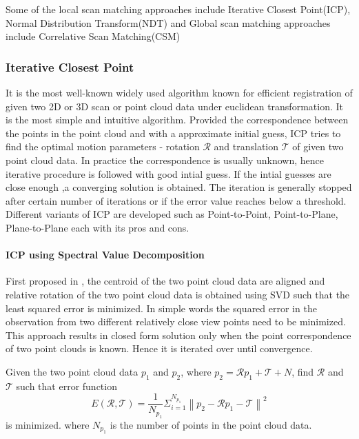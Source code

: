 Some of the local scan matching approaches include Iterative Closest Point(ICP), Normal  Distribution Transform(NDT) and Global scan matching approaches include Correlative Scan Matching(CSM)

\subsubsection{Iterative Closest Point}
    It is the most well-known widely used algorithm known for  efficient registration of given two 2D or 3D scan or point cloud data under euclidean transformation. It is the most simple and intuitive algorithm.
Provided the correspondence between the points in the point cloud and with a  approximate initial guess, ICP tries to find the optimal motion parameters - rotation $\mathcal{R}$ and translation $\mathcal{T}$ of given 
two point cloud data. In practice the correspondence is usually unknown, hence iterative procedure is followed with good intial guess. If the intial guesses are close enough ,a converging solution is obtained.
The iteration is generally stopped after certain number of iterations or if the error value reaches below a threshold. Different variants of ICP are developed such as Point-to-Point, Point-to-Plane,
Plane-to-Plane each with its pros and cons. 

\paragraph{ICP using Spectral Value Decomposition}
First proposed in \cite{KS.Arun}, the centroid of the two point cloud data are aligned and relative rotation of the two point cloud data is obtained using SVD such that the least squared error is minimized.
In simple words the squared error in the observation from two different relatively close view points need to be minimized. 
This approach results in closed form solution only when the point correspondence of two point clouds is known. Hence it is iterated over until convergence.
\par
Given the two point cloud data $p_1$ and $p_2$, where $p_2 = \mathcal{R}p_1 + \mathcal{T} + N$, find $\mathcal{R}$ and $\mathcal{T}$ such that error function
\begin{equation}
    E(\mathcal{R}, \mathcal{T}) = \frac{1}{N_{p_1}}  \Sigma_{i=1}^{N_{p_1}}\left\lVert p_2 - \mathcal{R} p_1 -\mathcal{T} \right\rVert^2 
\end{equation}
is minimized.
where $N_{p_1}$ is the number of points in the point cloud data.

